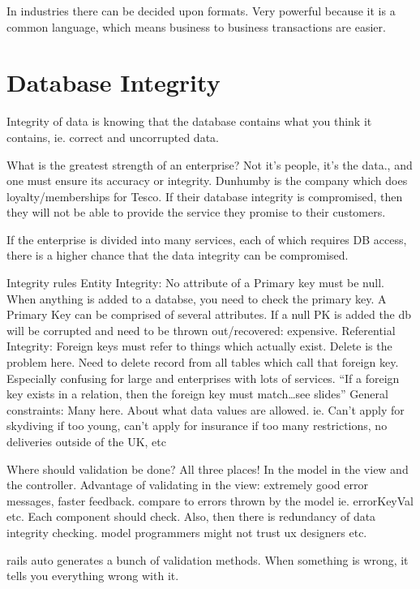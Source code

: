 \documentclass[11pt]{article}
\begin{document}
In industries there can be decided upon formats. Very powerful because it is a common language, which means business to business transactions are easier.





\section{Database Integrity}

Integrity of data is knowing that the database contains what you think it contains, ie. correct and uncorrupted data.

What is the greatest strength of an enterprise? Not it’s people, it’s the data., and one must ensure its accuracy or integrity. Dunhumby is the company which does loyalty/memberships for Tesco. If their database integrity is compromised, then they will not be able to provide the service they promise to their customers.

If the enterprise is divided into many services, each of which requires DB access, there is a higher chance that the data integrity can be compromised.

Integrity rules
Entity Integrity: No attribute of a Primary key must be null. When anything is added to a databse, you need to check the primary key. A Primary Key can be comprised of several attributes. If a null PK is added the db will be corrupted and need to be thrown out/recovered: expensive.
Referential Integrity: Foreign keys must refer to things which actually exist. Delete is the problem here. Need to delete record from all tables which call that foreign key. Especially confusing for large and enterprises with lots of services. “If a foreign key exists in a relation, then the foreign key must match…see slides”
General constraints: Many here. About what data values are allowed. ie. Can’t apply for skydiving if too young, can’t apply for insurance if too many restrictions, no deliveries outside of the UK, etc

Where should validation be done?
All three places! In the model in the view and the controller. Advantage of validating in the view: extremely good error messages, faster feedback. compare to errors thrown by the model ie. errorKeyVal etc. Each component should check. Also, then there is redundancy of data integrity checking. model programmers might not trust ux designers etc.

rails auto generates a bunch of validation methods. When something is wrong, it tells you everything wrong with it.
\end{document}
